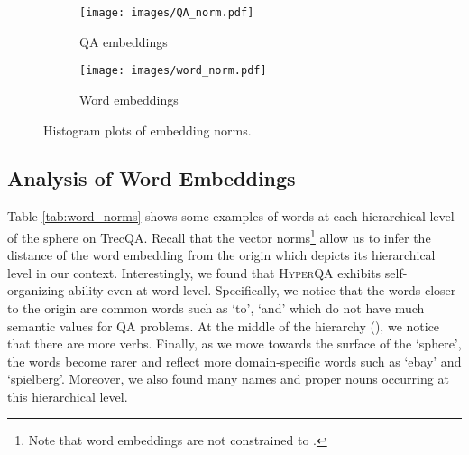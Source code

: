 \documentclass[sigconf]{acmart}
\begin{document}
\begin{figure}[H]
\centering

\begin{subfigure}{0.21\textwidth}
  \centering
  \texttt{[image: images/QA\_norm.pdf]}
  \caption{QA embeddings}
  \label{fig:sub3}
\end{subfigure}\begin{subfigure}{0.21\textwidth}
  \centering
  \texttt{[image: images/word\_norm.pdf]}
  \caption{Word embeddings}
  \label{fig:sub4}
\end{subfigure}
\caption{Histogram plots of embedding norms.}
\label{fig:histograms}
\end{figure}


\subsection{Analysis of Word Embeddings}
Table \ref{tab:word_norms} shows some examples of words at each hierarchical level of the sphere on TrecQA. Recall that the vector norms\footnote{Note that word embeddings are not constrained to .} allow us to infer the distance of the word embedding from the origin which depicts its hierarchical level in our context. Interestingly, we found that \textsc{HyperQA} exhibits self-organizing ability even at word-level. Specifically, we notice that the words closer to the origin are common words such as `to', `and' which do not have much semantic values for QA problems. At the middle of the hierarchy (), we notice that there are more verbs. Finally, as we move towards the surface of the `sphere', the words become rarer and reflect more domain-specific words such as `ebay' and `spielberg'. Moreover, we also found many names and proper nouns occurring at this hierarchical level. 
\end{document}
